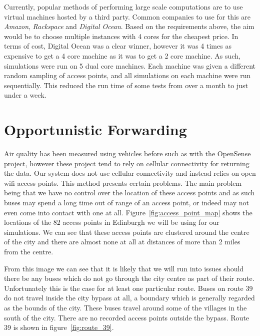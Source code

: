             Currently, popular methods of performing large scale computations are to use virtual machines hosted by a third party. Common companies to use for this are \emph{Amazon}, \emph{Rackspace} and \emph{Digital Ocean}. Based on the requirements above, the aim would be to choose multiple instances with 4 cores for the cheapest price. In terms of cost, Digital Ocean was a clear winner, however it was 4 times as expensive to get a 4 core machine as it was to get a 2 core machine. As such, simulations were run on 5 dual core machines. Each machine was given a different random sampling of access points, and all simulations on each machine were run sequentially. This reduced the run time of some tests from over a month to just under a week. 


    \section{Opportunistic Forwarding}\label{simulation_opportunistic_forwarding}


        Air quality has been measured using vehicles before such as with the OpenSense project, however these project tend to rely on cellular connectivity for returning the data. Our system does not use cellular connectivity and instead relies on open wifi access points. This method presents certain problems. The main problem being that we have no control over the location of these access points and as such buses may spend a long time out of range of an access point, or indeed may not even come into contact with one at all. Figure~\ref{fig:access_point_map} shows the locations of the 82 access points in Edinburgh we will be using for our simulations. We can see that these access points are clustered around the centre of the city and there are almost none at all at distances of more than 2 miles from the centre. 


        From this image we can see that it is likely that we will run into issues should there be any buses which do not go through the city centre as part of their route. Unfortunately this is the case for at least one particular route. Buses on route 39 do not travel inside the city bypass at all, a boundary which is generally regarded as the bounds of the city. These buses travel around some of the villages in the south of the city. There are no recorded access points outside the bypass. Route 39 is shown in figure~\ref{fig:route_39}.

